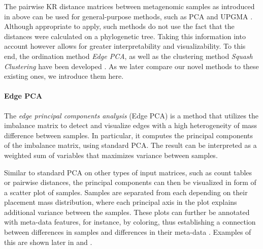 The pairwise KR distance matrices between metagenomic samples as introduced
in  above can be used for general-purpose methods,
such as PCA \cite{Pearson1901,Jolliffe2002} and UPGMA \cite{Michener1957,Sokal1958,Legendre1998}.
Although appropriate to apply, such methods do not use the fact that the distances were calculated on a phylogenetic tree.
Taking this information into account however allows for greater interpretability and visualizability.
To this end, the ordination method \emph{Edge PCA},
as well as the clustering method \emph{Squash Clustering} have been developed \cite{Matsen2011a}.
As we later compare our novel methods to these existing ones, we introduce them here.


\paragraph{Edge PCA}
\label{ch:Foundations:sec:PhylogeneticPlacement:sub:ExistingMethods:par:EdgePCA}


The \emph{edge principal components analysis} (Edge PCA) \cite{Matsen2011a}
is a method that utilizes the imbalance matrix to detect and visualize edges
with a high heterogeneity of mass difference between samples.
In particular, it computes the principal components of the imbalance matrix, using standard PCA.
The result can be interpreted as a weighted sum of variables that maximizes variance between samples.

Similar to standard PCA on other types of input matrices, such as count tables or pairwise distances,
the principal components can then be visualized in form of a scatter plot of samples.
Samples are separated from each depending on their placement mass distribution,
where each principal axis in the plot explains additional variance between the samples.
These plots can further be annotated with meta-data features, for instance, by coloring,
thus establishing a connection between differences in samples and differences in their meta-data \cite{Srinivasan2012}.
Examples of this are shown later in  and .


